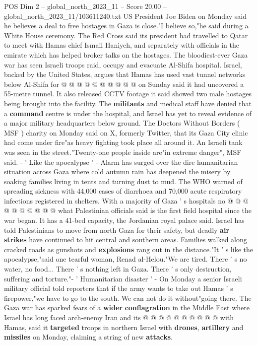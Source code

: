 \begin{textsample}{POS Dim 2 – global\_north\_2023\_11 – Score 20.00 – global\_north\_2023\_11/103611240.txt}
US President Joe Biden on Monday said he believes a deal to free hostages in Gaza is close."I believe so,"he said during a White House ceremony.
The Red Cross said its president had travelled to Qatar to meet with Hamas chief Ismail Haniyeh, and separately with officials in the emirate which has helped broker talks on the hostages.
The bloodiest-ever Gaza war has seen Israeli troops raid, occupy and evacuate Al-Shifa hospital.
Israel, backed by the United States, argues that Hamas has used vast tunnel networks below Al-Shifa for @ @ @ @ @ @ @ @ @ @ on Sunday said it had uncovered a 55-metre tunnel.
It also released CCTV footage it said showed two male hostages being brought into the facility.
The \textbf{militants} and medical staff have denied that a \textbf{command} centre is under the hospital, and Israel has yet to reveal evidence of a major military headquarters below ground.
The Doctors Without Borders ( MSF ) charity on Monday said on X, formerly Twitter, that its Gaza City clinic had come under fire"as heavy fighting took place all around it.
An Israeli tank was seen in the street."Twenty-one people inside are"in extreme danger", MSF said. - ' Like the apocalypse ' - Alarm has surged over the dire humanitarian situation across Gaza where cold autumn rain has deepened the misery by soaking families living in tents and turning dust to mud.
The WHO warned of spreading sickness with 44,000 cases of diarrhoea and 70,000 acute respiratory infections registered in shelters.
With a majority of Gaza ' s hospitals no @ @ @ @ @ @ @ @ @ @ what Palestinian officials said is the first field hospital since the war began.
It has a 41-bed capacity, the Jordanian royal palace said.
Israel has told Palestinians to move from north Gaza for their safety, but deadly \textbf{air} \textbf{strikes} have continued to hit central and southern areas.
Families walked along cracked roads as gunshots and \textbf{explosions} rang out in the distance."It ' s like the apocalypse,"said one tearful woman, Renad al-Helou."We are tired.
There ' s no water, no food...
There ' s nothing left in Gaza.
There ' s only destruction, suffering and torture."- ' Humanitarian disaster ' - On Monday a senior Israeli military official told reporters that if the army wants to take out Hamas ' s firepower,"we have to go to the south.
We can not do it without"going there.
The Gaza war has sparked fears of a \textbf{wider} \textbf{conflagration} in the Middle East where Israel has long faced arch-enemy Iran and its @ @ @ @ @ @ @ @ @ @ with Hamas, said it \textbf{targeted} troops in northern Israel with \textbf{drones}, \textbf{artillery} and \textbf{missiles} on Monday, claiming a string of new \textbf{attacks}.

\end{textsample}
